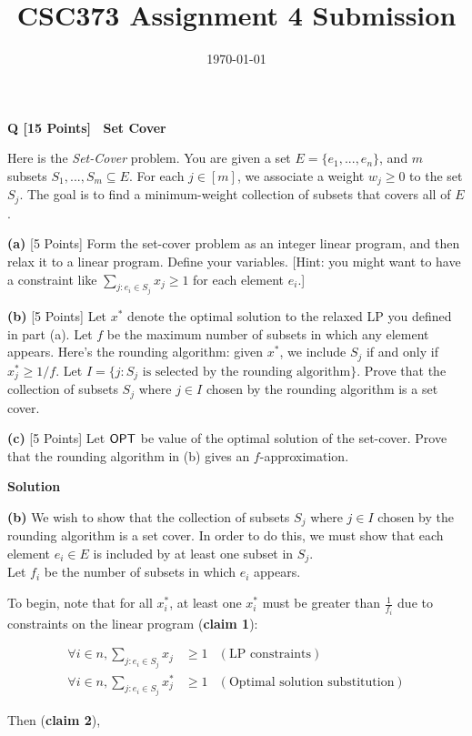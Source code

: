 \documentclass[11pt]{article}
\title{CSC373 Assignment 4 Submission}
\date{\today}
\newcounter{question}
\newcommand{\question}[2]{%
	\stepcounter{question}
	\vspace{.25in} \textbf{Q\arabic{question} 
		\ifthenelse{\isempty{#1}}%
		{}%
		{[#1 Points]\ }%
		#2}\vspace{0.10in}
}
\newcommand{\qpart}[2]{%
	\vspace{.10in} \textbf{(#1)}
	\ifthenelse{\isempty{#2}}%
	{}%
	{[#2 Points]}%
}
\newcommand{\solution}{\vspace{.25in}\textbf{Solution}\vspace{.10in}}
\newcommand{\solpart}[1] {\vspace{.10in}\textbf{(#1)}}
\begin{document}
\maketitle

\question{15}{Set Cover}

Here is the {\it Set-Cover} problem. You are given a set $E = \{ e_1, ..., e_n \}$, and $m$ subsets $S_1, ..., S_m \subseteq E$. For each $j \in [m]$, we associate a weight $w_j \geq 0$ to the set $S_j$. The goal is to find a minimum-weight collection of subsets that covers all of $E$. 

\qpart{a}{5} Form the set-cover problem as an integer linear program, and then relax it to a linear program. Define your variables. [Hint: you might want to have a constraint like $\sum_{j:e_i \in S_j} x_j \geq 1$ for each element $e_i$.]

\qpart{b}{5} Let $x^*$ denote the optimal solution to the relaxed LP you defined in part (a). Let $f$ be the maximum number of subsets in which any element appears. Here's the rounding algorithm: given $x^*$, we include $S_j$ if and only if $x^*_j \geq 1/f$. Let $I = \{ j : S_j \text{ is selected by the rounding algorithm} \}$. Prove that the collection of subsets $S_j$ where $j \in I$ chosen by the rounding algorithm is a set cover.

\qpart{c}{5} Let ${\sf OPT}$ be value of the optimal solution of the set-cover. Prove that the rounding algorithm in (b) gives an $f$-approximation.

\solution

\solpart{b} We wish to show that the collection of subsets $S_j$ where $j \in I$ chosen by the rounding algorithm is a set cover. In order to do this, we must show that each element $e_i \in E$ is included by at least one subset in $S_j$. \\

Let $f_i$ be the number of subsets in which $e_i$ appears. 

To begin, note that for all $x^*_i$, at least one $x^*_i$ must be greater than $\frac{1}{f_i}$ due to constraints on the linear program (\textbf{claim 1}):

\begin{align}
	\forall i \in n, \sum_{j:e_i \in S_j} x_j &\geq 1 &(\text{LP constraints}) \\
	\forall i \in n, \sum_{j:e_i \in S_j} x^*_j &\geq 1 &(\text{Optimal solution substitution})
\end{align}

Then (\textbf{claim 2}),
\end{document}
